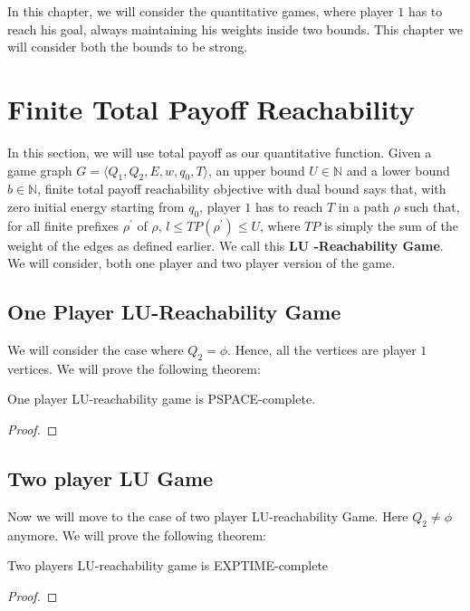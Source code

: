 In this chapter, we will consider the quantitative games, where player $1$ has to reach his goal, always maintaining his weights inside two bounds. This chapter we will consider both the bounds to be strong.

\section{Finite Total Payoff Reachability}

In this section, we will use total payoff as our quantitative function. Given a game graph $G=\langle Q_1, Q_2, E, w, q_0, T \rangle$, an upper bound $U \in \mathbb{N}$ and a lower bound $b \in \mathbb{N}$, finite total payoff reachability objective with dual bound says that, with zero initial energy starting from $q_0$, player $1$ has to reach $T$ in a path $\rho$ such that, for all finite prefixes $\rho^{\prime}$ of $\rho$, $l\leq TP(\rho^{\prime})\leq U$, where $TP$ is simply the sum of the weight of the edges as defined earlier. We call this \textbf{LU -Reachability Game}. We will consider, both one player and two player version of the game. 
\subsection{One Player LU-Reachability Game}
We will consider the case where $Q_2= \phi$. Hence, all the vertices are player $1$ vertices. We will prove the following theorem:\\
\begin{theorem}
\label{pspace-complete}
One player LU-reachability game is PSPACE-complete.
\end{theorem}
\begin{proof}
\end{proof}

\subsection{Two player LU Game}
Now we will move to the case of two player LU-reachability Game. Here $Q_2 \not = \phi$ anymore. We will prove the following theorem:
\begin{theorem}
\label{exp-complete}
Two players LU-reachability game is EXPTIME-complete
\end{theorem}
\begin{proof}

\end{proof}

\se